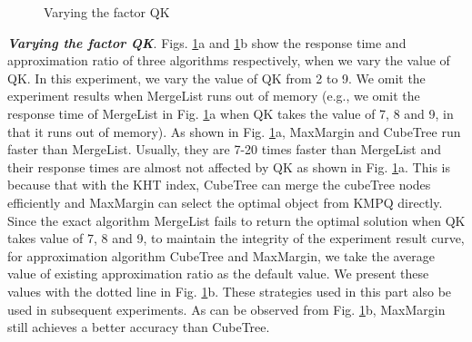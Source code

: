 \begin{figure}[h] \centering
\caption{Varying the factor QK}
\label{F6}
\end{figure}

\textbf{\textit{Varying the factor QK}}. Figs. \ref{F6}a and \ref{F6}b show the response time and approximation ratio of three algorithms respectively, when we vary the value of QK. In this experiment, we vary the value of QK from 2 to 9. We omit the experiment results when MergeList runs out of memory (e.g., we omit the response time of MergeList in Fig. \ref{F6}a when QK takes the value of 7, 8 and 9, in that it runs out of memory). As shown in Fig. \ref{F6}a, MaxMargin and CubeTree run faster than MergeList. Usually, they are 7-20 times faster than MergeList and their response times are almost not affected by QK as shown in Fig. \ref{F6}a. This is because that with the KHT index, CubeTree can merge the cubeTree nodes efficiently and MaxMargin can select the optimal object from KMPQ directly. Since the exact algorithm MergeList fails to return the optimal solution when QK takes value of 7, 8 and 9, to maintain the integrity of the experiment result curve, for approximation algorithm CubeTree and MaxMargin, we take the average value of existing approximation ratio as the default value. We present these values with the dotted line in Fig. \ref{F6}b. These strategies used in this part also be used in subsequent experiments. As can be observed from Fig. \ref{F6}b, MaxMargin still achieves a better accuracy than CubeTree.

